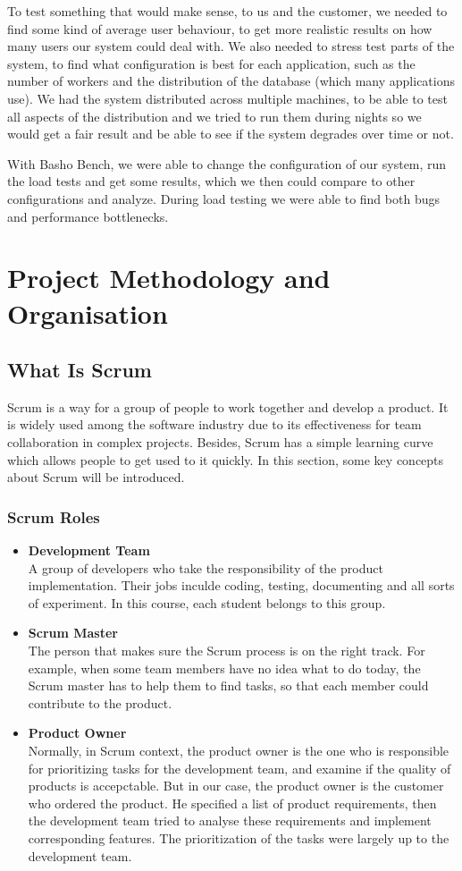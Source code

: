 \documentclass[11pt,a4paper]{report}
\begin{document}
To test something that would make sense, to us and the customer, we needed to
find some kind of average user behaviour, to get more realistic results on how
many users our system could deal with. We also needed to stress test parts of
the system, to find what configuration is best for each application, such as the
number of workers and the distribution of the database (which many applications
use). We had the system distributed across multiple machines, to be able to
test all aspects of the distribution and we tried to run them during nights so
we would get a fair result and be able to see if the system degrades over time
or not.

With Basho Bench, we were able to change the configuration of our system, run
the load tests and get some results, which we then could compare to other
configurations and analyze. During load testing we were able to find both bugs
and performance bottlenecks.

\chapter{Project Methodology and Organisation}
\section{What Is Scrum}
Scrum is a way for a group of people to work together and develop a product.
It is widely used among the software industry due to its effectiveness for
team collaboration in complex projects. Besides, Scrum has a simple learning
curve which allows people to get used to it quickly. In this section,
some key concepts about Scrum will be introduced.
\subsection{Scrum Roles}
\begin{itemize}
\item \textbf{Development Team}\\
A group of developers who take the responsibility of the product
implementation. Their jobs inculde coding, testing, documenting and
all sorts of experiment. In this course, each student belongs to this
group. 
\item \textbf{Scrum Master}\\
The person that makes sure the Scrum process is on the right track.
For example, when some team members have no idea what to do today,
the Scrum master has to help them to find tasks, so that each member could contribute
to the product.
\item \textbf{Product Owner}\\
Normally, in Scrum context, the product owner is the one who is responsible for
prioritizing tasks for the development team, and examine if the quality of
products is accepctable.
But in our case, the product owner is the customer who ordered the product.
He specified a list of product requirements, then the development team tried to
analyse these requirements and implement corresponding features. The prioritization
of the tasks were largely up to the development team.

\end{itemize}
\end{document}
